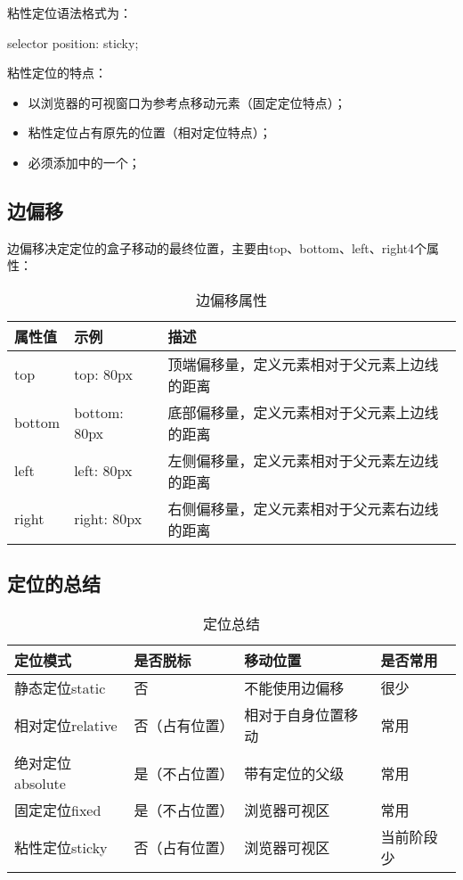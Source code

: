 粘性定位语法格式为：
\begin{css}
    selector {
    position: sticky;
    }
\end{css}
粘性定位的特点：
\begin{itemize}
    \item 以浏览器的可视窗口为参考点移动元素（固定定位特点）；
    \item 粘性定位占有原先的位置（相对定位特点）；
    \item 必须添加中的一个；
\end{itemize}

\subsection{边偏移\label{edgeOffset}}
边偏移决定定位的盒子移动的最终位置，主要由top、bottom、left、right4个属性：
\begin{table}[H]
    \centering
    \caption{边偏移属性}
    \label{edgeOffsetTable}
    \begin{tabular}{lll}
        \hline
        属性值    & 示例           & 描述                     \\
        \hline
        top    & top: 80px    & 顶端偏移量，定义元素相对于父元素上边线的距离 \\
        bottom & bottom: 80px & 底部偏移量，定义元素相对于父元素上边线的距离 \\
        left   & left: 80px   & 左侧偏移量，定义元素相对于父元素左边线的距离 \\
        right  & right: 80px  & 右侧偏移量，定义元素相对于父元素右边线的距离 \\
        \hline
    \end{tabular}
\end{table}
\subsection{定位的总结}
\begin{table}[H]
    \centering
    \caption{定位总结}
    \begin{tabular}{llll}
        \hline
        定位模式         & 是否脱标    & 移动位置      & 是否常用  \\
        \hline
        静态定位static   & 否       & 不能使用边偏移   & 很少    \\
        相对定位relative & 否（占有位置） & 相对于自身位置移动 & 常用    \\
        绝对定位absolute & 是（不占位置） & 带有定位的父级   & 常用    \\
        固定定位fixed    & 是（不占位置） & 浏览器可视区    & 常用    \\
        粘性定位sticky   & 否（占有位置） & 浏览器可视区    & 当前阶段少 \\
        \hline
    \end{tabular}
\end{table}
